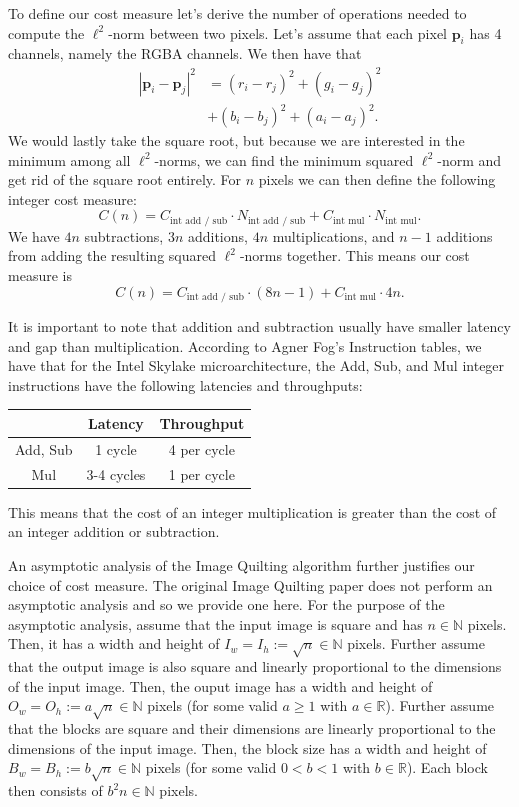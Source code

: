 \documentclass[letterpaper]{article}
\newcommand{\R}[0]{\mathbb{R}}
\newcommand{\N}[0]{\mathbb{N}}
\begin{document}
To define our cost measure let's derive the number of operations needed to compute the $\ell ^2$-norm between two pixels. Let's assume that each pixel $\bm{p}_i$ has 4 channels, namely the RGBA channels. We then have that
\begin{align*}
  |\bm{p}_i - \bm{p}_j| ^2 & = (r_i - r_j)^2 + (g_i - g_j)^2 \\
  & + (b_i - b_j)^2 + (a_i - a_j)^2.
\end{align*}
We would lastly take the square root, but because we are interested in the minimum among all $\ell ^2$-norms, we can find the minimum squared $\ell ^2$-norm and get rid of the square root entirely. For $n$ pixels we can then define the following integer cost measure:
\[
  C(n) = C _\text{int add / sub} \cdot N _\text{int add / sub} + C_\text{int mul} \cdot N _\text{int mul}.
\]
We have $4n$ subtractions, $3n$ additions, $4n$ multiplications, and $n-1$ additions from adding the resulting squared $\ell ^2$-norms together. This means our cost measure is
\[
  C(n) = C _\text{int add / sub} \cdot (8n - 1) + C_\text{int mul} \cdot 4n.
\]

It is important to note that addition and subtraction usually have smaller latency and gap than multiplication. According to Agner Fog's Instruction tables, we have that for the Intel Skylake microarchitecture, the Add, Sub, and Mul integer instructions have the following latencies and throughputs:

\begin{center}
  \begin{tabular}{c|c|c}
    & Latency & Throughput \\
    \hline
    Add, Sub & 1 cycle & 4 per cycle \\
    \hline
    Mul & 3-4 cycles & 1 per cycle \\
  \end{tabular}
\end{center}

This means that the cost of an integer multiplication is greater than the cost of an integer addition or subtraction.

An asymptotic analysis of the Image Quilting algorithm further justifies our choice of cost measure. The original Image Quilting paper \cite{Efros:01} does not perform an asymptotic analysis and so we provide one here. For the purpose of the asymptotic analysis, assume that the input image is square and has $n \in \N$ pixels. Then, it has a width and height of $I_w = I_h := \sqrt{n} \in \N$ pixels. Further assume that the output image is also square and linearly proportional to the dimensions of the input image. Then, the ouput image has a width and height of $O_w = O_h := a \sqrt{n} \in \N$ pixels (for some valid $a \ge 1$ with $a \in \R$). Further assume that the blocks are square and their dimensions are linearly proportional to the dimensions of the input image. Then, the block size has a width and height of $B_w = B_h := b \sqrt{n} \in \N$ pixels (for some valid $0 < b < 1$ with $b \in \R$). Each block then consists of $b^2 n \in \N$ pixels.
\end{document}
